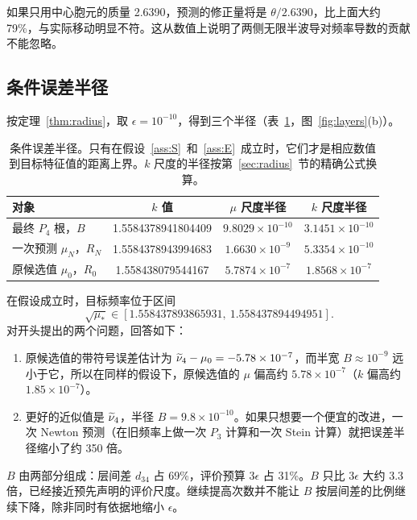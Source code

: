 \documentclass[11pt,a4paper,fontset=fandol]{ctexart}
\begin{document}
如果只用中心胞元的质量 2.6390，预测的修正量将是 $\theta/2.6390$，比上面大约 79\%，与实际移动明显不符。这从数值上说明了两侧无限半波导对频率导数的贡献不能忽略。

\subsection{条件误差半径}

按定理~\ref{thm:radius}，取 $\epsilon=10^{-10}$，得到三个半径（表~\ref{tab:radii}，图~\ref{fig:layers}(b)）。

\begin{table}[ht]
\centering
\caption{条件误差半径。只有在假设~\ref{ass:S}~和~\ref{ass:E}~成立时，它们才是相应数值到目标特征值的距离上界。$k$ 尺度的半径按第~\ref{sec:radius}~节的精确公式换算。}
\label{tab:radii}
\begin{tabular}{lccc}
\toprule
对象 & $k$ 值 & $\mu$ 尺度半径 & $k$ 尺度半径 \\
\midrule
最终 $P_4$ 根，$B$ & 1.5584378941804409 & $9.8029\times10^{-10}$ & $3.1451\times10^{-10}$ \\
一次预测 $\mu_N$，$R_N$ & 1.5584378943994683 & $1.6630\times10^{-9}$ & $5.3354\times10^{-10}$ \\
原候选值 $\mu_0$，$R_0$ & 1.558438079544167 & $5.7874\times10^{-7}$ & $1.8568\times10^{-7}$ \\
\bottomrule
\end{tabular}
\end{table}

在假设成立时，目标频率位于区间
\[
\sqrt{\mu_*}\in[1.558437893865931,\ 1.558437894494951] .
\]
对开头提出的两个问题，回答如下：
\begin{enumerate}
\item 原候选值的带符号误差估计为 $\widetilde\nu_4-\mu_0=-5.78\times10^{-7}$，而半宽 $B\approx10^{-9}$ 远小于它，所以在同样的假设下，原候选值的 $\mu$ 偏高约 $5.78\times10^{-7}$（$k$ 偏高约 $1.85\times10^{-7}$）。
\item 更好的近似值是 $\widetilde\nu_4$，半径 $B=9.8\times10^{-10}$。如果只想要一个便宜的改进，一次 Newton 预测（在旧频率上做一次 $P_3$ 计算和一次 Stein 计算）就把误差半径缩小了约 350 倍。
\end{enumerate}

$B$ 由两部分组成：层间差 $d_{34}$ 占 69\%，评价预算 $3\epsilon$ 占 31\%。$B$ 只比 $3\epsilon$ 大约 3.3 倍，已经接近预先声明的评价尺度。继续提高次数并不能让 $B$ 按层间差的比例继续下降，除非同时有依据地缩小 $\epsilon$。
\end{document}
